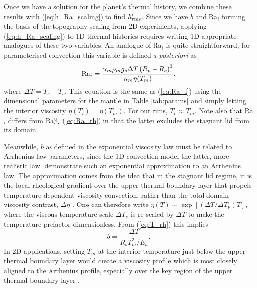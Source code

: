 \documentclass[trackchanges]{aastex63}
\begin{document}
Once we have a solution for the planet's thermal history, we combine these results with (\ref{eq:h_Ra_scaling}) to find $h_{\rm  rms}^\prime$. Since we have $b$ and Ra$_i$ forming the basis of the topography scaling from 2D experiments, applying (\ref{eq:h_Ra_scaling}) to 1D thermal histories requires writing 1D-appropriate analogues of these two variables. An analogue of Ra$_i$ is quite straightforward; for parameterised convection this variable is defined \textit{a posteriori} as
\begin{equation}\label{eq:Ra_i_1D}
    {\rm Ra}_i = \frac{\alpha_m\rho_m g_s \Delta T \left(R_p - R_c\right)^3}{\kappa_m \eta(T_m)},
\end{equation}
where $\Delta T = T_s - T_c$. This equation is the same as (\ref{eq:Ra_i}) using the dimensional parameters for the mantle in Table \ref{tab:params} and simply letting the interior viscosity $\eta(T_i) = \eta(T_m)$. For our runs, $T_c \approx T_m$. Note also that Ra$_i$ differs from Ra$_{\rm rh}^u$ (\ref{eq:Ra_rh}) in that the latter excludes the stagnant lid from its domain.

Meanwhile, $b$ as defined in the exponential viscosity law must be related to Arrhenius law parameters, since the 1D convection model the latter, more-realistic law. \citet{moresi_numerical_1995} demonstrate such an exponential approximation to an Arrhenius law. The approximation comes from the idea that in the stagnant lid regime, it is the local rheological gradient over the upper thermal boundary layer that propels temperature-dependent viscosity convection, rather than the total domain viscosity contrast, $\Delta \eta$ \citep{davaille_transient_1993}. One can therefore write $\eta(T) \sim \exp\left[\left( \Delta T / \Delta T_\nu \right) T \right]$, where the viscous temperature scale $\Delta T_\nu$ is re-scaled by $\Delta T$ to make the temperature prefactor dimensionless. From (\ref{eq:T_rh}) this implies
\begin{equation} \label{eq:b-1D}
    b = \frac{\Delta T}{R_b T_m^2 / E_a}.
\end{equation}
In 2D applications, setting $T_m$ at the interior temperature just below the upper thermal boundary layer would create a viscosity profile which is most closely aligned to the Arrhenius profile, especially over the key region of the upper thermal boundary layer \citep{moresi_numerical_1995}.
\end{document}
